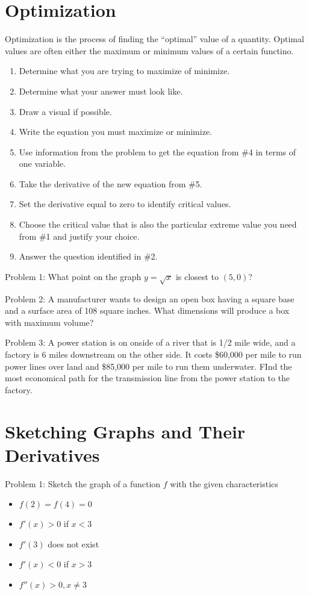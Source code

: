 \documentclass[../abcalc.tex]{subfiles}
\begin{document}
\section{Optimization}
Optimization is the process of finding the ``optimal'' value of a quantity. Optimal values are often either the maximum or minimum values of a certain functino.
\begin{enumerate}
    \item Determine what you are trying to maximize of minimize.
    \item Determine what your answer must look like.
    \item Draw a visual if possible.
    \item Write the equation you must maximize or minimize.
    \item Use information from the problem to get the equation from \#4 in terms of one variable.
    \item Take the derivative of the new equation from \#5.
    \item Set the derivative equal to zero to identify critical values.
    \item Choose the critical value that is also the particular extreme value you need from \#1 and justify your choice.
    \item Answer the question identified in \#2.
\end{enumerate}
Problem 1: What point on the graph $y=\sqrt{x}$ is closest to $(5,0)$?

Problem 2: A manufacturer wants to design an open box having a square base and a surface area of 108 square inches. What dimensions 
will produce a box with maximum volume?

Problem 3: A power station is on onside of a river that is 1/2 mile wide, and a factory is 6 miles downstream on the other side. It costs 
\$60,000 per mile to run power lines over land and \$85,000 per mile to run them underwater. FInd the most economical path for the transmission 
line from the power station to the factory.
\section{Sketching Graphs and Their Derivatives}
Problem 1: Sketch the graph of a function $f$ with the given characteristics
\begin{itemize}
    \item $f(2)=f(4)=0$
    \item $f'(x)>0$ if $x<3$
    \item $f'(3)$ does not exist
    \item $f'(x)<0$ if $x>3$
    \item $f''(x)>0, x\neq 3$
\end{itemize}
\end{document}
